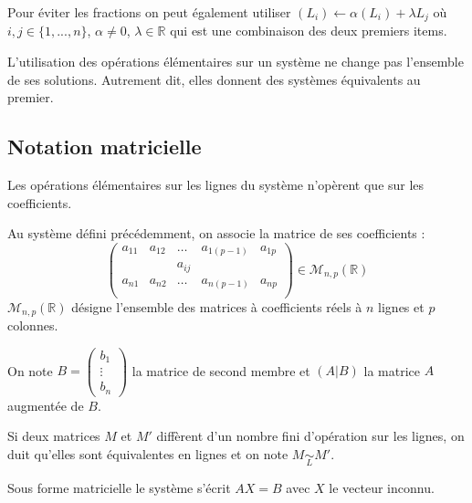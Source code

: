 \documentclass[10pt]{article}
\begin{document}
\begin{rem}
Pour éviter les fractions on peut également utiliser $(L_i)\leftarrow \alpha (L_i) + \lambda L_j$ où $i,j\in \{1,...,n\}$, $\alpha \neq 0$, $\lambda \in \mathbb{R}$ qui est une combinaison des deux premiers items.
\end{rem}

\begin{prop}
L'utilisation des opérations élémentaires sur un système ne change pas l'ensemble de ses solutions. Autrement dit, elles donnent des systèmes équivalents au premier.
\end{prop}

\subsection{Notation matricielle}
\begin{rem}
Les opérations élémentaires sur les lignes du système n'opèrent que sur les coefficients. 
\end{rem}

\begin{defi}
Au système défini précédemment, on associe la matrice de ses coefficients :
$$
\begin{pmatrix}
a_{11} & a_{12} & \ldots & a_{1(p-1)} & a_{1p} \\
 & & a_{ij} & & \\
a_{n1} & a_{n2} & \ldots & a_{n(p-1)} & a_{np} \\
\end{pmatrix} \in \mathcal{M}_{n,p}(\mathbb{R})
$$
$\mathcal{M}_{n,p}(\mathbb{R})$ désigne l'ensemble des matrices à coefficients réels à $n$ lignes et $p$ colonnes. 
\end{defi}

\begin{defi}
On note $B=\begin{pmatrix} b_1 \\ \vdots \\ b_n \end{pmatrix}$ la matrice de second membre et $(A|B)$ la matrice $A$ augmentée de $B$. 
\end{defi}


\begin{defi}
Si deux matrices $M$ et $M'$ diffèrent d'un nombre fini d'opération sur les lignes, on duit qu'elles sont équivalentes en lignes et on note $M \underset{L}{\sim} M'$. 
\end{defi}

\begin{rem}
Sous forme matricielle le système s'écrit $AX=B$ avec $X$ le vecteur inconnu. 
\end{rem}
\end{document}
